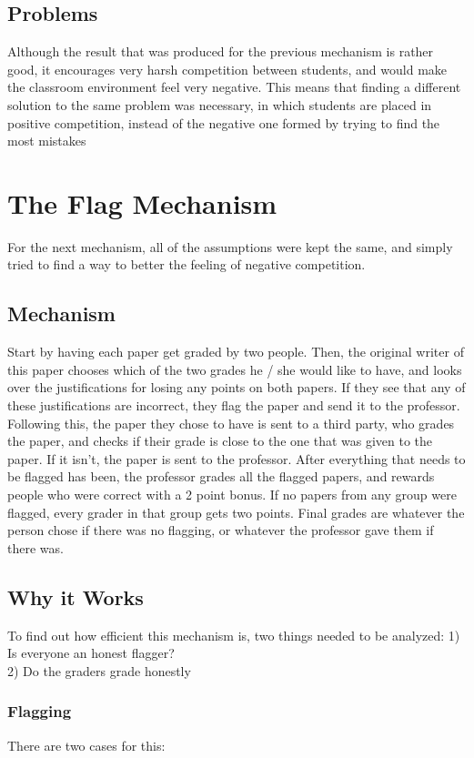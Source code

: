\documentclass[12pt, Arial]{article}
\begin{document}
\subsection{Problems}
Although the result that was produced for the previous mechanism is rather good, it encourages very harsh competition between students, and would make the classroom environment feel very negative. This means that finding a different solution to the same problem was necessary, in which students are placed in positive competition, instead of the negative one formed by trying to find the most mistakes

\section{The Flag Mechanism}
For the next mechanism, all of the assumptions were kept the same, and simply tried to find a way to better the feeling of negative competition.
\subsection{Mechanism}
Start by having each paper get graded by two people. Then, the original writer of this paper chooses which of the two grades he / she would like to have, and looks over the justifications for losing any points on both papers. If they see that any of these justifications are incorrect, they flag the paper and send it to the professor. Following this, the paper they chose to have is sent to a third party, who grades the paper, and checks if their grade is close to the one that was given to the paper. If it isn't, the paper is sent to the professor. After everything that needs to be flagged has been, the professor grades all the flagged papers, and rewards people who were correct with a 2 point bonus. If no papers from any group were flagged, every grader in that group gets two points. Final grades are whatever the person chose if there was no flagging, or whatever the professor gave them if there was.
\subsection{Why it Works}
To find out how efficient this mechanism is, two things needed to be analyzed:
1) Is everyone an honest flagger?
$$$$
2) Do the graders grade honestly
\subsubsection{Flagging}
There are two cases for this:
\end{document}
